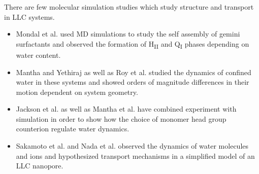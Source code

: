   There are few molecular simulation studies which study structure and transport
  in LLC systems.
  \begin{itemize}
    \item Mondal et al. used MD simulations to study the self assembly of gemini 
    surfactants and observed the formation of H\textsubscript{II} and Q\textsubscript{I}
    phases depending on water content.\cite{mondal_self-assembly_2013}
    \item Mantha and Yethiraj as well as Roy et al. studied the dynamics of confined 
    water in these systems and showed orders of magnitude differences in their motion
    dependent on system geometry.~\cite{mantha_dynamics_2016,roy_water_2016}
    \item Jackson et al. as well as Mantha et al. have combined experiment with simulation
    in order to show how the choice of monomer head group counterion regulate water 
    dynamics.~\cite{jackson_ion-specific_2018,mantha_counterion-regulated_2018}
    \item Sakamoto et al. and Nada et al. observed the dynamics of water molecules
    and ions and hypothesized transport mechanisms in a simplified model of an LLC
    nanopore.~\cite{sakamoto_development_2018,nada_transport_2020}
  \end{itemize}

